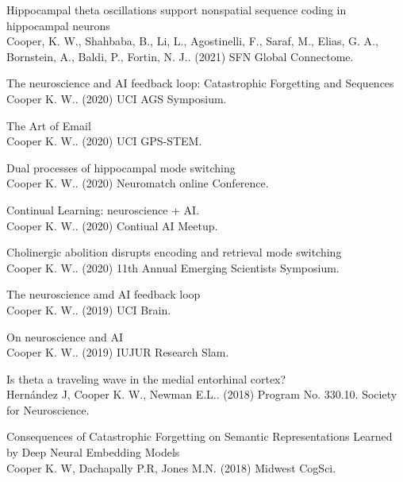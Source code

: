 \documentclass[10pt]{cooperCV2}
\begin{document}
 
\begin{etaremune}[itemindent=-1.5\bibhang, topsep=0pt,
				   itemsep=\bibsep,partopsep=0pt,parsep=0pt,leftmargin={\bibhang+\widthof{[999]}}] 
    
    \item Hippocampal theta oscillations support nonspatial sequence coding in hippocampal neurons\\ Cooper, K. W., Shahbaba, B., Li, L., Agostinelli, F., Saraf, M., Elias, G. A., Bornstein, A., Baldi, P.,  Fortin, N. J.. (2021) SFN Global Connectome. 
     
	
    \item The neuroscience and AI feedback loop: Catastrophic Forgetting and Sequences\\ Cooper K. W.. (2020) UCI AGS Symposium. 
     
	
    \item The Art of Email\\ Cooper K. W.. (2020) UCI GPS-STEM. 
     
	
    \item Dual processes of hippocampal mode switching\\ Cooper K. W.. (2020) Neuromatch online Conference. 
     
	
    \item Continual Learning: neuroscience + AI.\\ Cooper K. W.. (2020) Contiual AI Meetup. 
     
	
    \item Cholinergic abolition disrupts encoding and retrieval mode switching\\ Cooper K. W.. (2020) 11th Annual Emerging Scientists Symposium. 
     
	
    \item The neuroscience amd AI feedback loop\\ Cooper K. W.. (2019) UCI Brain. 
     
	
    \item On neuroscience and AI\\ Cooper K. W.. (2019) IUJUR Research Slam. 
     
	
    \item Is theta a traveling wave in the medial entorhinal cortex?\\ Hernández J, Cooper K. W., Newman E.L.. (2018) Program No. 330.10. Society for Neuroscience. 
     
	
    \item Consequences of Catastrophic Forgetting on Semantic Representations Learned by Deep Neural Embedding Models\\ Cooper K. W, Dachapally P.R, Jones M.N. (2018) Midwest CogSci. 
     

\end{etaremune}
\end{document}
